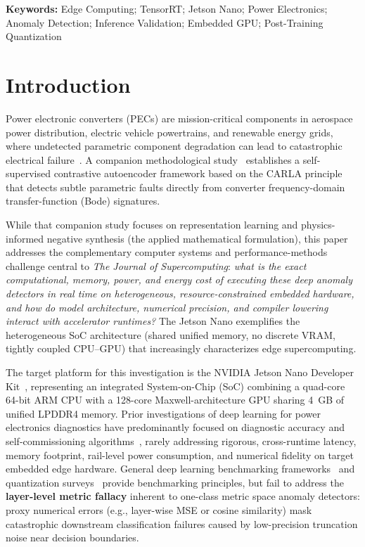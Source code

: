 \documentclass[11pt,a4paper]{article}
\begin{document}
\noindent\textbf{Keywords:} Edge Computing; TensorRT; Jetson Nano; Power Electronics; Anomaly Detection; Inference Validation; Embedded GPU; Post-Training Quantization

\section{Introduction}
\label{sec:intro}

Power electronic converters (PECs) are mission-critical components in aerospace power distribution, electric vehicle powertrains, and renewable energy grids, where undetected parametric component degradation can lead to catastrophic electrical failure~\cite{idrisov2025digitaltwin,liu2023review}. A companion methodological study~\cite{mmas_anomaly_detection} establishes a self-supervised contrastive autoencoder framework based on the CARLA principle~\cite{darban2025carla} that detects subtle parametric faults directly from converter frequency-domain transfer-function (Bode) signatures. 

While that companion study focuses on representation learning and physics-informed negative synthesis (the applied mathematical formulation), this paper addresses the complementary computer systems and performance-methods challenge central to \emph{The Journal of Supercomputing}: \emph{what is the exact computational, memory, power, and energy cost of executing these deep anomaly detectors in real time on heterogeneous, resource-constrained embedded hardware, and how do model architecture, numerical precision, and compiler lowering interact with accelerator runtimes?} The Jetson Nano exemplifies the heterogeneous SoC architecture (shared unified memory, no discrete VRAM, tightly coupled CPU--GPU) that increasingly characterizes edge supercomputing.

The target platform for this investigation is the NVIDIA Jetson Nano Developer Kit~\cite{nvidia2019jetsonnano}, representing an integrated System-on-Chip (SoC) combining a quad-core 64-bit ARM CPU with a 128-core Maxwell-architecture GPU sharing 4~GB of unified LPDDR4 memory. Prior investigations of deep learning for power electronics diagnostics have predominantly focused on diagnostic accuracy and self-commissioning algorithms~\cite{gomez2024selfcommissioning,beattie2022robust}, rarely addressing rigorous, cross-runtime latency, memory footprint, rail-level power consumption, and numerical fidelity on target embedded edge hardware. General deep learning benchmarking frameworks~\cite{banbury2021mlperftiny,baller2021deepedgebench,sze2017efficient} and quantization surveys~\cite{gholami2022quantsurvey,jacob2018quantization} provide benchmarking principles, but fail to address the \textbf{layer-level metric fallacy} inherent to one-class metric space anomaly detectors: proxy numerical errors (e.g., layer-wise MSE or cosine similarity) mask catastrophic downstream classification failures caused by low-precision truncation noise near decision boundaries.
\end{document}
